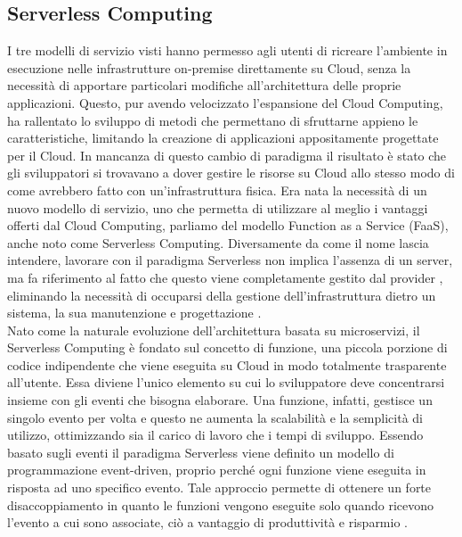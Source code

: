 \subsection{Serverless Computing} \label{Serverless}
I tre modelli di servizio visti hanno permesso agli utenti di ricreare l’ambiente in esecuzione nelle infrastrutture on-premise direttamente su Cloud, senza la necessità di apportare particolari modifiche all'architettura delle proprie applicazioni. Questo, pur avendo velocizzato l’espansione del Cloud Computing, ha rallentato lo sviluppo di metodi che permettano di sfruttarne appieno le caratteristiche, limitando la creazione di applicazioni appositamente progettate per il Cloud. In mancanza di questo cambio di paradigma il risultato è stato che gli sviluppatori si trovavano a dover gestire le risorse su Cloud allo stesso modo di come avrebbero fatto con un’infrastruttura fisica. Era nata la necessità di un nuovo modello di servizio, uno che permetta di utilizzare al meglio i vantaggi offerti dal Cloud Computing, parliamo del modello Function as a Service (FaaS), anche noto come Serverless Computing. Diversamente da come il nome lascia intendere, lavorare con il paradigma Serverless non implica l’assenza di un server, ma fa riferimento al fatto che questo viene completamente gestito dal provider , eliminando la necessità di occuparsi della gestione dell’infrastruttura dietro un sistema, la sua manutenzione e progettazione \cite{MixedMethod}. \\
Nato come la naturale evoluzione dell’architettura basata su microservizi, il Serverless Computing è fondato sul concetto di funzione, una piccola porzione di codice indipendente che viene eseguita su Cloud in modo totalmente trasparente all’utente. Essa diviene l’unico elemento su cui lo sviluppatore deve concentrarsi insieme con gli eventi che bisogna elaborare. Una funzione, infatti, gestisce un singolo evento per volta e questo ne aumenta la scalabilità e la semplicità di utilizzo, ottimizzando sia il carico di lavoro che i tempi di sviluppo. Essendo basato sugli eventi il paradigma Serverless viene definito un modello di programmazione event-driven, proprio perché ogni funzione viene eseguita in risposta ad uno specifico evento. Tale approccio permette di ottenere un forte disaccoppiamento in quanto le funzioni vengono eseguite solo quando ricevono l’evento a cui sono associate, ciò a vantaggio di produttività e risparmio \cite{ServerlessBook}. \\
